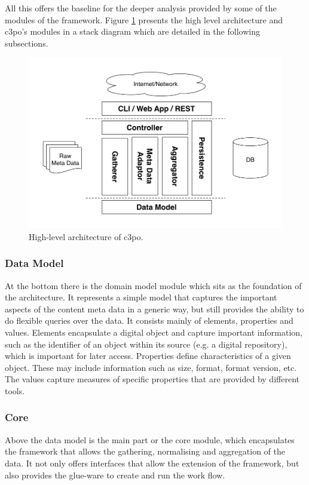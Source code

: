 All this offers the baseline for the deeper analysis provided by some of the modules of the framework. Figure \ref{fig:architecture_highlevel} presents the high level architecture and c3po's modules in a stack diagram which are detailed in the following subsections.


\begin{figure}[t]
\begin{center}
\includegraphics[width=5in]{figures/architecture/c3po_highlevel_architecture.png}
\caption{High-level architecture of c3po.}
\label{fig:architecture_highlevel}
\end{center}
\end{figure}


\subsubsection{Data Model}

At the bottom there is the domain model module which sits as the foundation of the architecture. It represents a simple model that captures the important aspects of the content meta data in a generic way, but still provides the ability to do flexible queries over the data. It consists mainly of elements, properties and values. Elements encapsulate a digital object and capture important information, such as the identifier of an object within its source (e.g. a digital repository), which is important for later access. Properties define characteristics of a given object. These may include information such as size, format, format version, etc. The values capture measures of specific properties that are provided by different tools.

\subsubsection{Core}
Above the data model is the main part or the core module, which encapsulates the framework that allows the gathering, normalising and aggregation of the data. It not only offers interfaces that allow the extension of the framework, but also provides the glue-ware to create and run the work flow.


